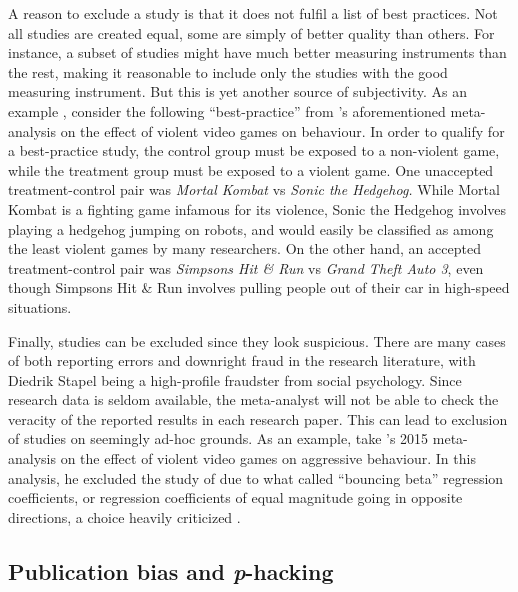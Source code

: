 A reason to exclude a study is that it does not fulfil a list of best practices. Not all studies are created equal, some are simply of better quality than others. For instance, a subset of studies might have much better measuring instruments than the rest, making it reasonable to include only the studies with the good measuring instrument. But this is yet another source of subjectivity. As an example \parencite[][p. 6]{lakens_reproducibility_2016}, consider the following ``best-practice'' from \textcite{Anderson2010-ki}'s aforementioned meta-analysis on the effect of violent video games  on behaviour. In order to qualify for a best-practice study, the control group must be exposed to a non-violent game, while the treatment group must be exposed to a violent game. One unaccepted treatment-control pair was \emph{Mortal Kombat} vs \emph{Sonic the Hedgehog.} While Mortal Kombat is a fighting game infamous for its violence, Sonic the Hedgehog involves playing a hedgehog jumping on robots, and would easily be classified as among the least violent games by many researchers. On the other hand, an accepted treatment-control pair was \emph{Simpsons Hit \& Run} vs \emph{Grand Theft Auto 3}, even though Simpsons Hit \& Run involves pulling people out of their car in high-speed situations. 

Finally, studies can be excluded since they look suspicious. There are many cases of both reporting errors \parencite{Nuijten2016-eu} and downright fraud in the research literature, with Diedrik Stapel being a high-profile fraudster from social psychology. Since research data is seldom available, the meta-analyst will not be able to check the veracity of the reported results in each research paper. This can lead to exclusion of studies on seemingly ad-hoc grounds. As an example, take \citeauthor{ferguson_angry_2015}'s 2015 meta-analysis on the effect of violent video games on aggressive behaviour. In this analysis, he excluded the study of \textcite{gentile_effects_2009} due to what \textcite{ferguson_angry_2015} called ``bouncing beta'' regression coefficients, or regression coefficients of equal magnitude going in opposite directions, a choice heavily criticized \textcite{gentile_what_2015}.

\subsection{Publication bias and \textit{p}-hacking}

